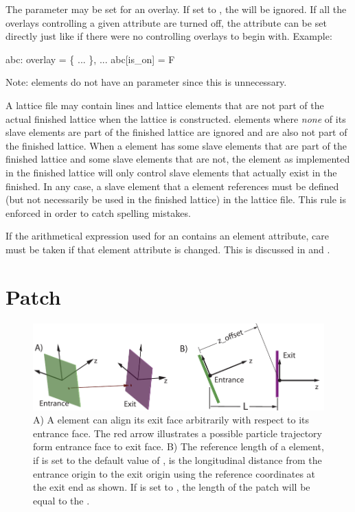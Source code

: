 {The  parameter may be set for an overlay. If set to , the  will be
ignored. If all the overlays controlling a given attribute are turned off, the attribute can be
set directly just like if there were no controlling overlays to begin with. Example:
\begin{example}
  abc: overlay = \{ ... \}, ...
  abc[is_on] = F
\end{example}
Note:  elements do not have an  parameter since this is unnecessary.

A lattice file may contain lines and lattice elements that are not part of the actual finished
lattice when the lattice is constructed.  elements where {\em none} of its slave elements
are part of the finished lattice are ignored and are also not part of the finished lattice.  When a
 element has some slave elements that are part of the finished lattice and some slave
elements that are not, the  element as implemented in the finished lattice will only
control slave elements that actually exist in the finished. In any case, a slave element that a
 element references must be defined (but not necessarily be used in the finished lattice)
in the lattice file. This rule is enforced in order to catch spelling mistakes.

If the arithmetical expression used for an  contains an element attribute, care must be
taken if that element attribute is changed. This is discussed in  and
.

\section{Patch}
\label{s:patch}

\begin{figure}[tb]
  \centering
  \includegraphics[width=5in]{patch.pdf}
  \caption[Patch Element.]
{A) A  element can align its exit face arbitrarily with respect to its entrance face. The
red arrow illustrates a possible particle trajectory form entrance face to exit face. B) The
reference length of a  element, if  is set to the default value of
, is the longitudinal distance from the entrance origin to the exit origin using the
reference coordinates at the exit end as shown. If  is set to , the
length of the patch will be equal to the .}
  \label{f:patch}
\end{figure}

}
